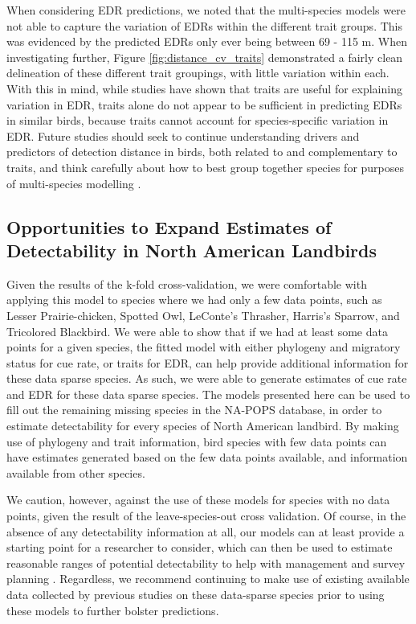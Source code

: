 \par When considering EDR predictions, we noted that the multi-species models were not able to capture the variation of EDRs within the different trait groups.
This was evidenced by the predicted EDRs only ever being between 69 - 115 m.
When investigating further, Figure \ref{fig:distance_cv_traits} demonstrated a fairly clean delineation of these different trait groupings, with little variation within each.
With this in mind, while studies have shown that traits are useful for explaining variation in EDR, traits alone do not appear to be sufficient in predicting EDRs in similar birds, because traits cannot account for species-specific variation in EDR. 
Future studies should seek to continue understanding drivers and predictors of detection distance in birds, both related to and complementary to traits, and think carefully about how to best group together species for purposes of multi-species modelling \citep{pacifici_guidelines_2014}.

\subsection{Opportunities to Expand Estimates of Detectability in North American Landbirds}

\par Given the results of the k-fold cross-validation, we were comfortable with applying this model to species where we had only a few data points, such as Lesser Prairie-chicken, Spotted Owl, LeConte's Thrasher, Harris's Sparrow, and Tricolored Blackbird.
We were able to show that if we had at least some data points for a given species, the fitted model with either phylogeny and migratory status for cue rate, or traits for EDR, can help provide additional information for these data sparse species.
As such, we were able to generate estimates of cue rate and EDR for these data sparse species.
The models presented here can be used to fill out the remaining missing species in the NA-POPS database, in order to estimate detectability for every species of North American landbird. 
By making use of phylogeny and trait information, bird species with few data points can have estimates generated based on the few data points available, and information available from other species.

\par We caution, however, against the use of these models for species with no data points, given the result of the leave-species-out cross validation.
Of course, in the absence of any detectability information at all, our models can at least provide a starting point for a researcher to consider, which can then be used to estimate reasonable ranges of potential detectability to help with management and survey planning \citep{bennett_how_2024}.
Regardless, we recommend continuing to make use of existing available data collected by previous studies on these data-sparse species prior to using these models to further bolster predictions.

